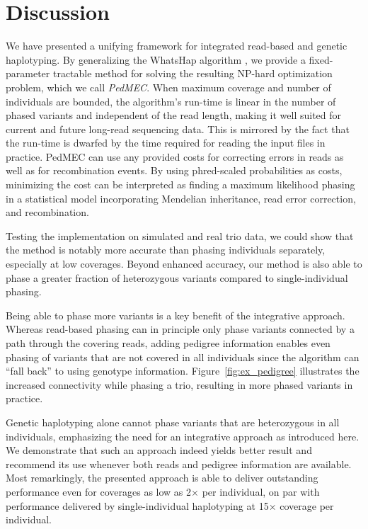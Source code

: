 \section{Discussion}
We have presented a unifying framework for integrated read-based and genetic haplotyping.
By generalizing the WhatsHap algorithm \citep{Patterson2015}, we provide a fixed-parameter tractable method for solving the resulting NP-hard optimization problem, which we call \emph{PedMEC}.
When maximum coverage and number of individuals are bounded, the algorithm's run-time is linear in the number of phased variants and independent of the read length, making it well suited for current and future long-read sequencing data.
This is mirrored by the fact that the run-time is dwarfed by the time required for reading the input files in practice.
PedMEC can use any provided costs for correcting errors in reads as well as for recombination events.
By using phred-scaled probabilities as costs, minimizing the cost can be interpreted as finding a maximum likelihood phasing in a statistical model incorporating Mendelian inheritance, read error correction, and recombination.

Testing the implementation on simulated and real trio data, we could show that the method is notably more accurate than phasing individuals separately, especially at low coverages.
Beyond enhanced accuracy, our method is also able to phase a greater fraction of heterozygous variants compared to single-individual phasing.

Being able to phase more variants is a key benefit of the integrative approach.
Whereas read-based phasing can in principle only phase variants connected by a path through the covering reads, adding pedigree information enables even phasing of variants that are not covered in all individuals since the algorithm can ``fall back'' to using genotype information.
Figure~\ref{fig:ex_pedigree} illustrates the increased connectivity while phasing a trio, resulting in more phased variants in practice.

Genetic haplotyping alone cannot phase variants that are heterozygous in all individuals, emphasizing the need for an integrative approach as introduced here.
We demonstrate that such an approach indeed yields better result and recommend its use whenever both reads and pedigree information are available.
Most remarkingly, the presented approach is able to deliver outstanding performance even for coverages as low as 2$\times$ per individual, on par with performance delivered by single-individual haplotyping at 15$\times$ coverage per individual.

